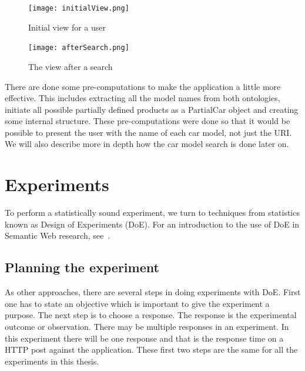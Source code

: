 \documentclass{llncs}
\begin{document}
\begin{figure}
  \centering
      \texttt{[image: initialView.png]}
  \caption{Initial view for a user}\label{initialView}
\end{figure}

\begin{figure}
  \centering
      \texttt{[image: afterSearch.png]}
  \caption{The view after a search}\label{afterSearch}
\end{figure}
There are done some pre-computations to make the application a little
more effective. This includes extracting all the model names from both
ontologies, initiate all possible partially defined products as a
PartialCar object and creating some internal structure. These
pre-computations were done so that it would be possible to present the
user with the name of each car model, not just the URI. We will also
describe more in depth how the car model search is done later on.


\section{Experiments}\label{Results}

To perform a statistically sound experiment, we turn to techniques
from statistics known as Design of Experiments (DoE). For an
introduction to the use of DoE in Semantic Web research, see~\cite{Kjern}.

\subsection{Planning the experiment}
As other approaches, there are several steps in doing experiments with DoE. 
First one has to state an objective which is important to give the experiment a purpose. 
The next step is to choose a response. The response is the experimental outcome or 
observation. There may be multiple responses in an experiment. In this experiment 
there will be one response and that is the response time on a HTTP post against the application. 
These first two steps are the same for all the experiments in this thesis.
\end{document}
